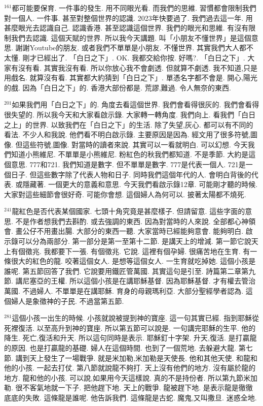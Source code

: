 \documentclass{book}
\begin{document}
$^{161}$都可能要保育.
一件事的發生.
用不同眼光看.
而我們的思維.
習慣都會限制我們對一個人.
一件事.
甚至對整個世界的認識.
2023年快要過了.
我們過去這一年.
用甚麼眼光去認識自己.
認識香港.
甚至認識這個世界.
我們的眼光和思維.
有沒有限制我們去認識.
這個天賦的世界.
所以我今天講題.
叫「小朋友不懂世界」是這個意思.
謝謝Youtube的朋友.
或者我們不單單是小朋友.
不懂世界.
其實我們大人都不太懂.
剛才已經出了.
「白日之下」.
OK.
我都交給你按.
好嗎?.
「白日之下」.
大家有沒有看.
其實我沒有看.
所以你放心我不會劇透.
但就算不劇透.
我不知道,只是用戲名.
就算沒有看.
其實都大約猜到「白日之下」.
單憑名字都不會是.
開心,陽光的戲.
因為「白日之下」的.
香港大部份都是.
荒謬,難過.
令人無奈的東西.

$^{201}$如果我們用「白日之下」的.
角度去看這個世界.
我們會看得很灰的.
我們會看得很失望的.
所以我今天和大家看啟示錄.
大家轉一轉角度.
我們向上.
看我們「白日之上」的世界.
以致我們在「白日之下」的生活.
除了失望,灰心.
都可以有不同的看法.
不少人和我說.
他們看不明白啟示錄.
主要原因是因為.
經文用了很多符號,圖像.
但這些符號,圖像.
對當時的讀者來說.
其實可以一看就明白.
可以幻想.
今天我們知道小熊維尼.
不單單是小熊維尼.
粉紅色的秋我們都知道.
不是季節.
大約是這個意思.
777和721.
我們知道是數字.
但不單單是數字.
777是代表一個人.
721是一個日子.
但這些數字除了代表人物和日子.
同時我們這個年代的人.
會明白背後的代表.
或隱藏著.
一個更大的意義和意思.
今天我們看啟示錄12章.
可能剛才聽的時候.
大家對這些細節會很好奇.
可能你會想.
這個婦人為何可以.
披著太陽都不燒死.

$^{241}$龍紅色是否代表某個國家.
七頭十角究竟是甚麼樣子.
但請留意.
這些字面的意思.
不是作者想我們去斟酌.
或去強調的東西.
因為對當時的人來說.
全部都心神領會.
畫公仔不用畫出腸.
大部分的東西一聽.
大家當時已經能夠意會.
能夠明白.
啟示錄可以分為兩部分.
第一部分是第一至第十二節.
是講天上的增減.
第一節它說天上有個徵兆.
我都要下一張.
有個徵兆.
它說.
這裡有個孕婦.
很痛苦地在生育.
有一條很大的紅色的龍.
咬著這個女人.
是想等這個女人.
一生育就吃掉她.
這個小孩是誰呢.
第五節回答了我們.
它說要用鐵匠管萬國.
其實這句是引至.
詩篇第二章第九節.
講尼塞亞的王權.
所以這個小孩是在講耶穌基督.
因為耶穌基督.
才有權去管治萬國.
不過婦人.
不單單是在講耶穌.
育身的母親瑪利亞.
大部分聖經學者認為.
這個婦人是象徵神的子民.
不過當第五節.

$^{281}$這個小孩一出生的時候.
小孩就說被提到神的寶座.
這一句其實已經.
指到耶穌從死裡復活.
以至高升到神的寶座.
所以第五節可以說是.
一句講完耶穌的生平.
他的降生.
死亡,復活和升天.
所以這句同時是表示.
耶穌釘十字架.
升天,復活.
是打贏龍的原因.
也是打贏龍的基礎.
婦人在這個時間.
也到了一個荒地.
去躲避大龍.
第七節.
講到天上發生了一場戰爭.
就是米加勒,米加勒是天使長.
他和其他天使.
和龍和他的小孩.
一起去打仗.
第八節就說龍不夠打.
天上沒有他們的地方.
沒有屬於龍的地方.
龍和他的小孩.
可以說,如果用今天這樣說.
真的不是持份者.
所以第九節米加勒.
很不客氣地就一下子.
把他趕下地.
天上的戰爭.
龍被趕下地.
是表示龍是徹徹底底的失敗.
這條龍是誰呢.
他告訴我們.
這條龍是古蛇.
魔鬼,又叫撒旦.
迷惑全地.
\end{document}
